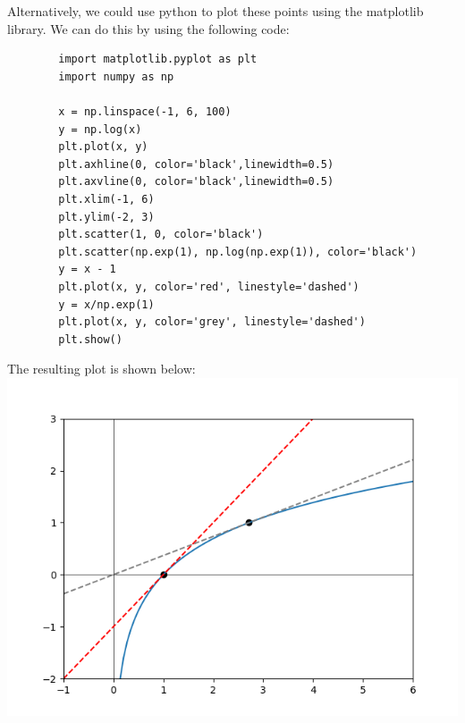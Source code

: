 \documentclass{article}
\begin{document}
    Alternatively, we could use python to plot these points using the matplotlib library. We can do this by using the following code: \\
    \begin{verbatim}
        import matplotlib.pyplot as plt
        import numpy as np
        
        x = np.linspace(-1, 6, 100)
        y = np.log(x)
        plt.plot(x, y)
        plt.axhline(0, color='black',linewidth=0.5)
        plt.axvline(0, color='black',linewidth=0.5)
        plt.xlim(-1, 6)
        plt.ylim(-2, 3)
        plt.scatter(1, 0, color='black')
        plt.scatter(np.exp(1), np.log(np.exp(1)), color='black')
        y = x - 1
        plt.plot(x, y, color='red', linestyle='dashed')
        y = x/np.exp(1)
        plt.plot(x, y, color='grey', linestyle='dashed')
        plt.show()
    \end{verbatim}
    \vfill
    \newpage
    The resulting plot is shown below: \\
    \includegraphics[scale=0.5]{2.2.1d_py.png} \\
   
\end{document}

